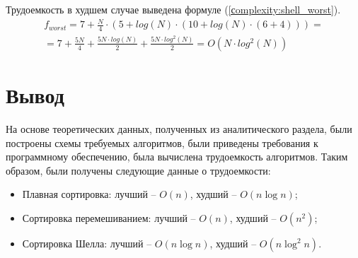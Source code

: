 Трудоемкость в худшем случае выведена формуле (\ref{сomplexity:shell_worst}).
\begin{equation}
	\label{сomplexity:shell_worst}
	\begin{gathered}
		f_{worst} = 7 + \frac{N}{4} \cdot (5 + log(N) \cdot (10 + log(N) \cdot (6 + 4))) =\\
		= 7 + \frac{5N}{4} + \frac{5N \cdot log(N)}{2} + \frac{5N \cdot log^2(N)}{2} = O(N \cdot log^2(N))
	\end{gathered}
\end{equation}
\newpage
\section*{Вывод}
На основе теоретических данных, полученных из аналитического раздела, были построены схемы требуемых алгоритмов, были приведены требования к программному обеспечению, была вычислена трудоемкость алгоритмов.
Таким образом, были получены следующие данные о трудоемкости:
\begin{itemize}
	\item Плавная сортировка: лучший -- $O(n)$, худший --  $O(n\log{n})$;
	\item Сортировка перемешиванием: лучший -- $O(n)$, худший -- $O(n^2)$; 
	\item Сортировка Шелла: лучший -- $O(n\log{n})$, худший -- $O(n\log^{2}n)$. 
\end{itemize}

